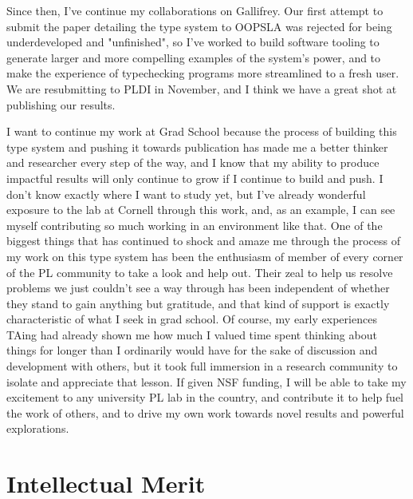 \documentclass{nsf-grfp}
\begin{document}
Since then, I've continue my collaborations on Gallifrey. Our first attempt to submit the paper detailing the type system to OOPSLA was rejected for being underdeveloped and "unfinished", so I've worked to build software tooling to generate larger and more compelling examples of the system's power, and to make the experience of typechecking programs more streamlined to a fresh user. We are resubmitting to PLDI in November, and I think we have a great shot at publishing our results. 

I want to continue my work at Grad School because the process of building this type system and pushing it towards publication has made me a better thinker and researcher every step of the way, and I know that my ability to produce impactful results will only continue to grow if I continue to build and push. I don't know exactly where I want to study yet, but I've already wonderful exposure to the lab at Cornell through this work, and, as an example, I can see myself contributing so much working in an environment like that. One of the biggest things that has continued to shock and amaze me through the process of my work on this type system has been the enthusiasm of member of every corner of the PL community to take a look and help out. Their zeal to help us resolve problems we just couldn't see a way through has been independent of whether they stand to gain anything but gratitude, and that kind of support is exactly characteristic of what I seek in grad school. Of course, my early experiences TAing had already shown me how much I valued time spent thinking about things for longer than I ordinarily would have for the sake of discussion and development with others, but it took full immersion in a research community to isolate and appreciate that lesson. If given NSF funding, I will be able to take my excitement to any university PL lab in the country, and contribute it to help fuel the work of others, and to drive my own work towards novel results and powerful explorations. 

\section*{Intellectual Merit}
\end{document}
